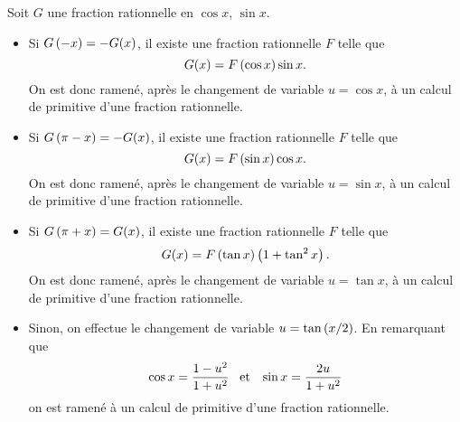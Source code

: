 \documentclass{magnolia}
\begin{document}
\begin{proposition}[nom={Règles de \nom{Bioche}}]
Soit $G$ une fraction rationnelle en $\cos x$, $\sin x$.
\begin{itemize}
\item Si $G\left(-x\right)=-G(x)$, il existe une fraction rationnelle $F$ telle que
  \[G(x)=F\left(\cos x\right)\sin x.\]
  On est donc ramené, après le changement de variable $u=\cos x$, à un calcul
  de primitive d'une fraction rationnelle.
\item Si $G\left(\pi-x\right)=-G(x)$, il existe une fraction rationnelle $F$ telle que
  \[G(x)=F\left(\sin x\right)\cos x.\]
  On est donc ramené, après le changement de variable $u=\sin x$, à un calcul
  de primitive d'une fraction rationnelle.
\item Si $G\left(\pi+x\right)=G(x)$, il existe une fraction rationnelle $F$ telle que
  \[G(x)=F\left(\tan x\right)\left(1+\tan^2 x\right).\]
  On est donc ramené, après le changement de variable $u=\tan x$, à un calcul
  de primitive d'une fraction rationnelle.
\item Sinon, on effectue le changement de variable $u=\tan\left(x/2\right)$. En
  remarquant que
  \[\cos x=\frac{1-u^2}{1+u^2} \quad\!\text{et}\quad\! \sin x=\frac{2u}{1+u^2}\]
  on est ramené à un calcul de primitive d'une fraction rationnelle.
\end{itemize}
\end{proposition}
\end{document}
